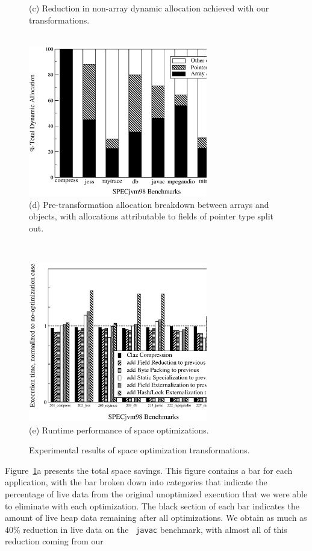 \documentclass{sig-alt-full}
\begin{document}
\begin{figure}
\begin{center}
{(c) Reduction in non-array dynamic allocation achieved with
    our transformations.
\\~}%
~~\parbox[b]{8cm}{\centering%
\includegraphics[width=7.8cm,clip=true]{Figures/sas-objarrptr.eps}\\
(d) Pre-transformation allocation breakdown between arrays and objects,
with allocations attributable to fields of pointer type split out.}%
\\[.3cm]
\parbox[b]{8cm}{\centering%
\includegraphics[width=7.8cm,clip=true]{Figures/oopsla-speed.eps}\\
(e) Runtime performance of space optimizations.}%
\end{center}
\caption{Experimental results of space optimization transformations.}
\label{fig:results}
\end{figure}
%
Figure~\ref{fig:results}a presents the total space savings. This
figure contains a bar for each application, with the bar broken
down into categories that indicate the percentage of live data from 
the original unoptimized execution that we were able to eliminate
with each optimization. The black section of each bar indicates the
amount of live heap data remaining after all optimizations. 
We obtain as much as 40\% reduction in live data on the {\tt
  javac} benchmark, with almost all of this reduction coming from our
\end{document}

